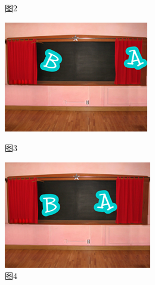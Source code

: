 \documentclass[10.5pt, a4paper]{article}
\begin{document}
\begin{enumerate}
\begin{figure}[htbp]
\begin{minipage}[t]{.18\textwidth}
                \caption*{图2}
            \end{minipage}
            \begin{minipage}[t]{.18\textwidth}
                \centering
                \includegraphics[width=\textwidth]{37-3.png}
                \caption*{图3}
            \end{minipage}
            \begin{minipage}[t]{.18\textwidth}
                \includegraphics[width=\textwidth]{37-4.png}
                \caption*{图4}
            \end{minipage}
            \begin{minipage}[t]{.18\textwidth}
                \centering

\end{minipage}
\end{figure}
\end{enumerate}
\end{document}
